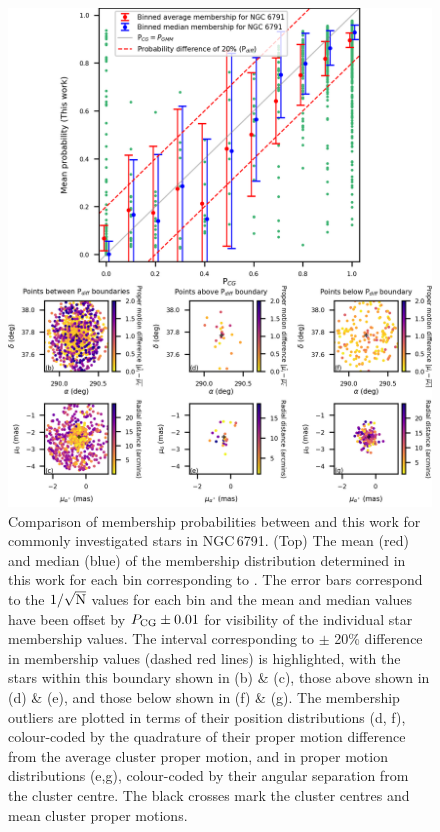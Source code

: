 \begin{figure}[hbtp]
    \centering
    \includegraphics[width=0.95\linewidth]{Chapter4/NGC6791_CG_comparison_mod.png}
    \caption[Comparison of membership probabilities for NGC\,6791]{Comparison of membership probabilities between \cite{cantat-gaudin_gaia_2018} and this work for commonly investigated stars in NGC\,6791. (Top) The mean (red) and median (blue) of the membership distribution determined in this work for each bin corresponding to \cite{cantat-gaudin_gaia_2018}. The error bars correspond to the $1/\sqrt{\rm N}$ values for each bin and the mean and median values have been offset by $P_{\rm CG} \pm 0.01$ for visibility of the individual star membership values. The interval corresponding to $\pm$ 20\% difference in membership values (dashed red lines) is highlighted, with the stars within this boundary shown in (b) \& (c), those above shown in (d) \& (e), and those below shown in (f) \& (g). The membership outliers are plotted in terms of their position distributions (d, f), colour-coded by the quadrature of their proper motion difference from the average cluster proper motion, and in proper motion distributions (e,g), colour-coded by their angular separation from the cluster centre. The black crosses mark the cluster centres and mean cluster proper motions.}
    \label{fig:CG_6791_comparison}
\end{figure}

